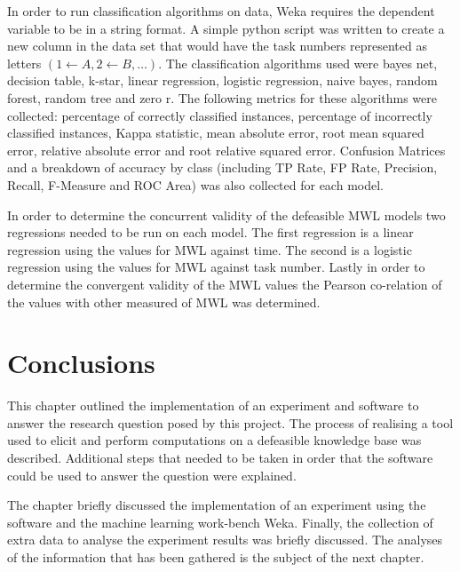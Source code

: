 In order to run classification algorithms on data, Weka requires the dependent variable to be in a string format. A simple python script was written to create a new column in the data set that would have the task numbers represented as letters $(1 \leftarrow A, 2 \leftarrow B, \ldots)$.
The classification algorithms used were bayes net, decision table, k-star, linear regression, logistic regression, naive bayes, random forest, random tree and zero r. The following metrics for these algorithms were collected: percentage of correctly classified instances, percentage of incorrectly classified instances, Kappa statistic, mean absolute error, root mean squared error, relative absolute error and root relative squared error. Confusion Matrices and a breakdown of accuracy by class (including TP Rate, FP Rate, Precision, Recall, F-Measure and ROC Area) was also collected for each model.

In order to determine the concurrent validity of the defeasible MWL models two regressions needed to be run on each model. The first regression is a linear regression using the values for MWL against time. The second is a logistic regression using the values for MWL against task number. Lastly in order to determine the convergent validity of the MWL values the Pearson co-relation of the values with other measured of MWL was determined.

\section{Conclusions}

This chapter outlined the implementation of an experiment and software to answer the research question posed by this project. The process of realising a tool used to elicit and perform computations on a defeasible knowledge base was described. Additional steps that needed to be taken in order that the software could be used to answer the question were explained.

The chapter briefly discussed the implementation of an experiment using the software and the machine learning work-bench Weka. Finally, the collection of extra data to analyse the experiment results was briefly discussed. The analyses of the information that has been gathered is the subject of the next chapter.